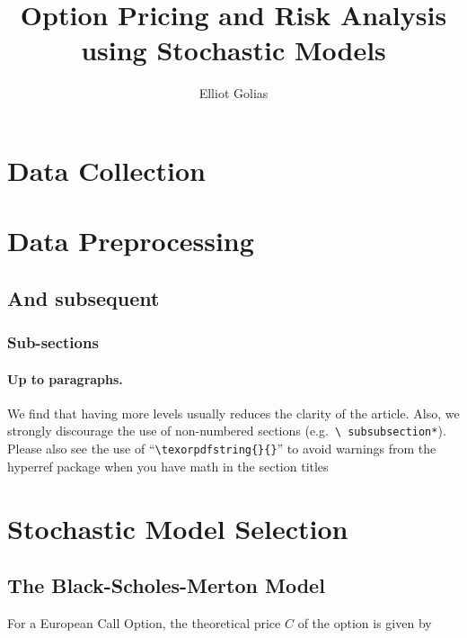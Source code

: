 \documentclass[a4paper,11pt]{article}
\title{\boldmath Option Pricing and Risk Analysis using Stochastic Models}
\author{Elliot Golias}
\begin{document}
 
\maketitle
\flushbottom

\section{Data Collection}
\label{sec:intro}


\section{Data Preprocessing}

\subsection{And subsequent}
\subsubsection{Sub-sections}
\paragraph{Up to paragraphs.} We find that having more levels usually
reduces the clarity of the article. Also, we strongly discourage the
use of non-numbered sections (e.g.~\texttt{\textbackslash
  subsubsection*}).  Please also see the use of
``\texttt{\textbackslash texorpdfstring\{\}\{\}}'' to avoid warnings
from the hyperref package when you have math in the section titles

\section{Stochastic Model Selection}

\subsection{The Black-Scholes-Merton Model}

For a European Call Option, the theoretical price $C$ of the option is given by
\end{document}
